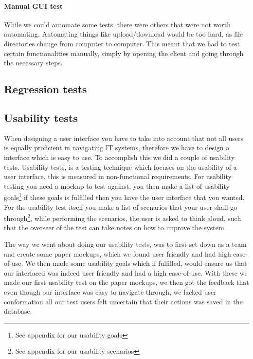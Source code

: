 \paragraph{Manual GUI test}
While we could automate some tests, there were others that were not worth automating. Automating things like upload/download would be too hard, as file directories change from computer to computer. This meant that we had to test certain functionalities manually, simply by opening the client and going through the necessary steps.

\subsection{Regression tests}
\label{Testing_Strategy_Regression}

\subsection{Usability tests}
\label{Testing_Strategy_Usability}
When designing a user interface you have to take into account that not all users is equally proficient in navigating IT systems, therefore we have to design a interface which is easy to use. To accomplish this we did a couple of usability tests. Usability tests, is a testing technique which focuses on the usability of a user interface, this is measured in non-functional requirements. For usability testing you need a mockup to test against, you then make a list of usability goals\footnote{See appendix for our usability goals} if these goals is fulfilled then you have the user interface that you wanted. For the usability test itself you make a list of scenarios that your user shall go through\footnote{See appendix for our usability scenarios}, while performing the scenarios, the user is asked to think aloud, such that the overseer of the test can take notes on how to improve the system.

The way we went about doing our usability tests, was to first set down as a team and create some paper mockups, which we found user friendly and had high ease-of-use. We then made some usability goals which if fulfilled, would ensure us that our interfaced was indeed user friendly and had a high ease-of-use. With these we made our first usability test on the paper mockups, we then got the feedback that even though our interface was easy to navigate through, we lacked user conformation all our test users felt uncertain that their actions was saved in the database.

